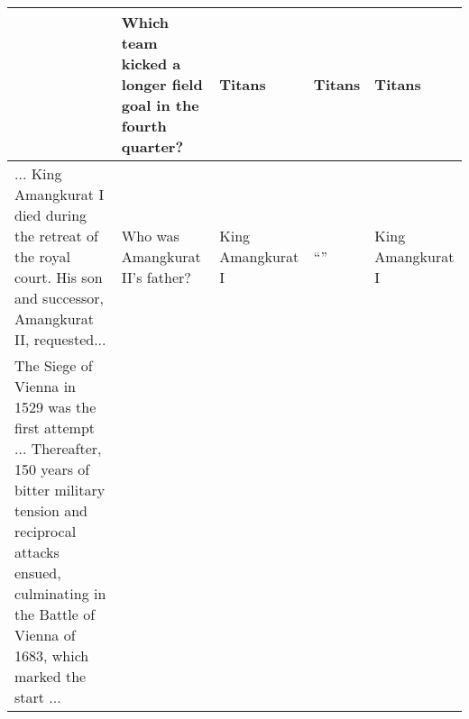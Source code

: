 \begin{table*}[t]
\begin{tabular}{p{7cm}p{2.8cm}p{1.5cm}p{1.5cm}p{1.5cm}}
 & Which team kicked a longer field goal in the fourth quarter?
 & Titans & Titans & Titans \\
 \midrule
... King Amangkurat I died during the retreat of the royal court. His son and successor, Amangkurat II, requested...
 & Who was Amangkurat II's father?
 & King Amangkurat I & ``'' & King Amangkurat I \\
 \midrule
The Siege of Vienna in 1529 was the first attempt ... Thereafter, 150 years of bitter military tension and reciprocal attacks ensued, culminating in the Battle of Vienna of 1683, which marked the start ...

\end{tabular}
\end{table*}
